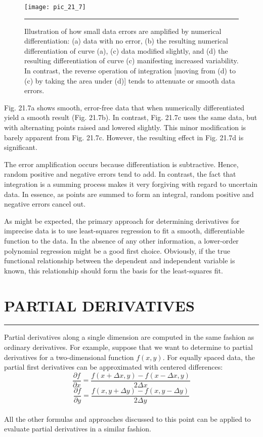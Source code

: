 \documentclass[../main.tex]{subfiles}
\begin{document}
\begin{figure}[hbt!]
	\centering
	\texttt{[image: pic\_21\_7]}
	\caption{\textsf{Illustration of how small data errors are amplified by numerical differentiation: (a) data with no
error, (b) the resulting numerical differentiation of curve (a), (c) data modified slightly, and (d) the
resulting differentiation of curve (c) manifesting increased variability. In contrast, the reverse
operation of integration [moving from (d) to (c) by taking the area under (d)] tends to attenuate 
or smooth data errors.}} \hrule
	\label{pic.21.7}
\end{figure}

Fig. 21.7a shows smooth, error-free data that when numerically differentiated yield
a smooth result (Fig. 21.7b). In contrast, Fig. 21.7c uses the same data, but with alternating points raised and lowered slightly. This minor modification is barely apparent from
Fig. 21.7c. However, the resulting effect in Fig. 21.7d is significant.

The error amplification occurs because differentiation is subtractive. Hence, random
positive and negative errors tend to add. In contrast, the fact that integration is a summing
process makes it very forgiving with regard to uncertain data. In essence, as points are
summed to form an integral, random positive and negative errors cancel out.

As might be expected, the primary approach for determining derivatives for imprecise
data is to use least-squares regression to fit a smooth, differentiable function to the data. In
the absence of any other information, a lower-order polynomial regression might be a good
first choice. Obviously, if the true functional relationship between the dependent and independent variable is known, this relationship should form the basis for the least-squares fit.

\vspace{0,6in}
\section{PARTIAL DERIVATIVES}
\vspace{0,1in}
\hrule
\vspace{0,1in}

Partial derivatives along a single dimension are computed in the same fashion as ordinary
derivatives. For example, suppose that we want to determine to partial derivatives for a
two-dimensional function $f (x, y)$. For equally spaced data, the partial first derivatives can be approximated with centered differences:
\begin{equation}
	\tag{21.22}
	\dfrac{\partial f}{\partial x} = \dfrac{f(x + \Delta x, y) - f(x- \Delta x, y)}{2\Delta x}
\end{equation}
\begin{equation}
	\tag{21.23}
	\dfrac{\partial f}{\partial y} = \dfrac{f(x,y+\Delta y) - f(x,y - \Delta y)}{2 \Delta y}
\end{equation}\\
All the other formulas and approaches discussed to this point can be applied to evaluate
partial derivatives in a similar fashion.
\end{document}
